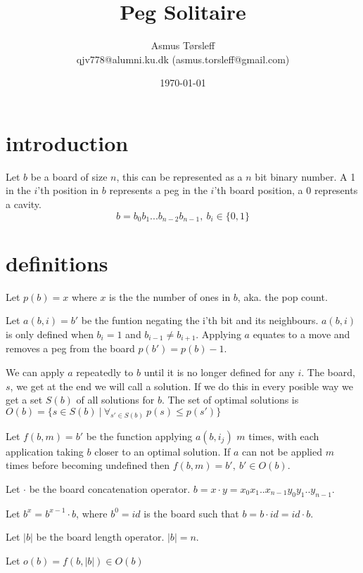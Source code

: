 \documentclass{article}
\title{Peg Solitaire}
\author{
\centering
\begin{tabular}{c}
    Asmus Tørsleff\\
    qjv778@alumni.ku.dk (asmus.torsleff@gmail.com)\\
\end{tabular}}
\date{\today}
\begin{document}
\maketitle
\section{introduction}
Let $b$ be a board of size $n$, this can be represented as a $n$ bit binary number. 
A 1 in the $i$'th position in $b$ represents a peg in the $i$'th board position, a 0 represents a cavity.
$$b=b_0b_1...b_{n-2}b_{n-1},\ b_i\in \{0,1\}$$
\section*{definitions}
Let $p(b)=x$ where $x$ is the the number of ones in $b$, aka. the pop count. 

\vspace{\baselineskip}
\noindent
Let $a(b, i)=b'$ be the funtion negating the i'th bit and its neighbours. $a(b,i)$ is only defined when $b_{i} = 1$ and $b_{i-1} \neq b_{i+1}$.  
Applying $a$ equates to a move and removes a peg from the board $p(b')=p(b)-1$.

\vspace{\baselineskip}
\noindent
We can apply $a$ repeatedly to $b$ until it is no longer defined for any $i$. 
The board, $s$, we get at the end we will call a solution.
If we do this in every posible way we get a set $S(b)$ of all solutions for $b$.
The set of optimal solutions is $O(b)=\{s\in S(b)\ |\ \forall_{s'\in S(b)}\ p(s)\le p(s')\}$

\vspace{\baselineskip}
\noindent
Let $f(b,m)=b'$ be the function applying $a(b,i_j)$ $m$ times, with each application taking $b$ closer to an optimal solution. 
If $a$ can not be applied $m$ times before becoming undefined then $f(b,m) = b',\ b'\in O(b)$. 

\vspace{\baselineskip}
\noindent
Let $\cdot$ be the board concatenation operator. $b=x\cdot y=x_0x_1..x_{n-1}y_0y_1..y_{n-1} $. 

\vspace{\baselineskip}
\noindent
Let $b^x=b^{x-1}\cdot b$, where $b^0=id$ is the board such that $b =b\cdot id=id\cdot b$. 

\vspace{\baselineskip}
\noindent
Let $|b|$ be the board length operator. $|b|=n$. 

\vspace{\baselineskip}
\noindent
Let $o(b) = f(b,|b|)\in O(b)$
\end{document}

